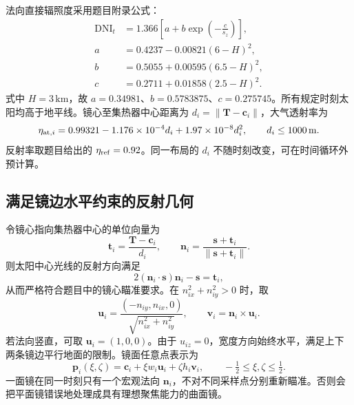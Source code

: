 \documentclass[UTF8,a4paper,zihao=-4,fontset=mac]{ctexart}
\newcommand{\vect}[1]{\bm{#1}}
\newcommand{\DNI}{\mathrm{DNI}}
\begin{document}
法向直接辐照度采用题目附录公式：
\begin{align}
\DNI_t&=1.366\left[a+b\exp\left(-\frac{c}{s_z}\right)\right],\\
a&=0.4237-0.00821(6-H)^2,\nonumber\\
b&=0.5055+0.00595(6.5-H)^2,\nonumber\\
c&=0.2711+0.01858(2.5-H)^2.\nonumber
\end{align}
式中 $H=3\,\mathrm{km}$，故 $a=0.34981$、$b=0.5783875$、$c=0.275745$。所有规定时刻太阳均高于地平线。镜心至集热器中心距离为 $d_i=\|\vect T-\vect c_i\|$，大气透射率为
\begin{equation}
\eta_{{\rm at},i}=0.99321-1.176\times10^{-4}d_i+1.97\times10^{-8}d_i^2,
\qquad d_i\le1000\,\mathrm m.
\label{eq:at}
\end{equation}
反射率取题目给出的 $\eta_{\rm ref}=0.92$。同一布局的 $d_i$ 不随时刻改变，可在时间循环外预计算。

\subsection{满足镜边水平约束的反射几何}
令镜心指向集热器中心的单位向量为
\begin{equation}
\vect t_i=\frac{\vect T-\vect c_i}{d_i},\qquad
\vect n_i=\frac{\vect s+\vect t_i}{\|\vect s+\vect t_i\|}.
\label{eq:normal}
\end{equation}
则太阳中心光线的反射方向满足
\begin{equation}
2(\vect n_i\cdot\vect s)\vect n_i-\vect s=\vect t_i,
\end{equation}
从而严格符合题目中的镜心瞄准要求。在 $n_{ix}^2+n_{iy}^2>0$ 时，取
\begin{equation}
\vect u_i=\frac{(-n_{iy},n_{ix},0)}{\sqrt{n_{ix}^2+n_{iy}^2}},
\qquad \vect v_i=\vect n_i\times\vect u_i.
\end{equation}
若法向竖直，可取 $\vect u_i=(1,0,0)$。由于 $u_{iz}=0$，宽度方向始终水平，满足上下两条镜边平行地面的限制。镜面任意点表示为
\begin{equation}
\vect p_i(\xi,\zeta)=\vect c_i+\xi w_i\vect u_i+\zeta h_i\vect v_i,
\qquad -\tfrac12\le\xi,\zeta\le\tfrac12.
\end{equation}
一面镜在同一时刻只有一个宏观法向 $\vect n_i$，不对不同采样点分别重新瞄准。否则会把平面镜错误地处理成具有理想聚焦能力的曲面镜。
\end{document}

